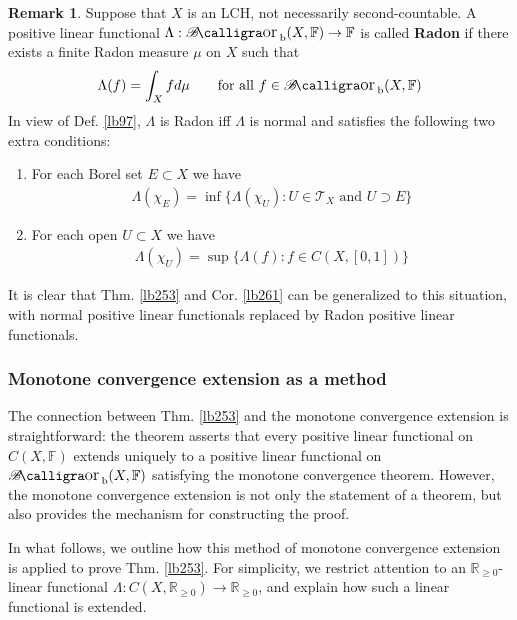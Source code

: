 \documentclass[12pt,b5paper,notitlepage]{article}
\theoremstyle{definition}
\newtheorem{rem}[df]{Remark}
\theoremstyle{plain}
\DeclareMathOperator{\Borb}{{\mathscr{B}\text{\kern -2pt {\calligra\large or}}\,}_{\mathrm b}}
\newcommand{\Rbb}{\mathbb R}
\newcommand{\Fbb}{\mathbb F}
\newcommand{\MT}{\mathcal T}
\numberwithin{equation}{section}
\begin{document}
\begin{rem}\label{lb275}
Suppose that $X$ is an LCH, not necessarily second-countable. A positive linear functional $\Lambda:\Borb(X,\Fbb)\rightarrow\Fbb$ is called \textbf{Radon}  if there exists a finite Radon measure $\mu$ on $X$ such that
\begin{align*}
\Lambda(f)=\int_X fd\mu\qquad\text{for all }f\in\Borb(X,\Fbb)
\end{align*}
In view of Def. \ref{lb97}, $\Lambda$ is Radon iff $\Lambda$ is normal and satisfies the following two extra conditions:
\begin{enumerate}[label=(\alph*)]
\item For each Borel set $E\subset X$ we have
\begin{align*}
\Lambda(\chi_E)=\inf\big\{\Lambda(\chi_U):U\in\MT_X\text{ and }U\supset E  \big\}
\end{align*} 
\item For each open $U\subset X$ we have
\begin{align*}
\Lambda(\chi_U)=\sup\big\{\Lambda(f):f\in C(X,[0,1])  \big\}
\end{align*}
\end{enumerate}
It is clear that Thm. \ref{lb253} and Cor. \ref{lb261} can be generalized to this situation, with normal positive linear functionals replaced by Radon positive linear functionals.
\end{rem}



\subsubsection{Monotone convergence extension as a method}


The connection between Thm. \ref{lb253} and the monotone convergence extension is straightforward: the theorem asserts that every positive linear functional on $C(X,\Fbb)$ extends uniquely to a positive linear functional on $\Borb(X,\Fbb)$ satisfying the monotone convergence theorem. However, the monotone convergence extension is not only the statement of a theorem, but also provides the mechanism for constructing the proof. 

In what follows, we outline how this method of monotone convergence extension is applied to prove Thm. \ref{lb253}. For simplicity, we restrict attention to an $\Rbb_{\geq0}$-linear functional $\Lambda:C(X,\Rbb_{\geq0})\rightarrow\Rbb_{\geq0}$, and explain how such a linear functional is extended.
\end{document}
